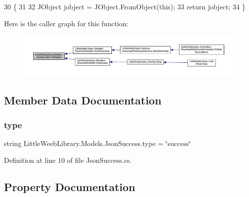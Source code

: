 \begin{DoxyCode}
30         \{
31 
32             JObject jobject = JObject.FromObject(\textcolor{keyword}{this});
33             \textcolor{keywordflow}{return} jobject;
34         \}
\end{DoxyCode}
Here is the caller graph for this function\+:\nopagebreak
\begin{figure}[H]
\begin{center}
\leavevmode
\includegraphics[width=350pt]{class_little_weeb_library_1_1_models_1_1_json_success_aa0e750a34606497266e5a4aedc03cdeb_icgraph}
\end{center}
\end{figure}


\subsection{Member Data Documentation}
\mbox{\label{class_little_weeb_library_1_1_models_1_1_json_success_a6c518d7f5a6e5b08760bda2ea952a0ad}} 
\subsubsection{\texorpdfstring{type}{type}}
{\footnotesize\ttfamily string Little\+Weeb\+Library.\+Models.\+Json\+Success.\+type = \char`\"{}success\char`\"{}}



Definition at line 10 of file Json\+Success.\+cs.



\subsection{Property Documentation}
\mbox{\label{class_little_weeb_library_1_1_models_1_1_json_success_a6ccf690286fe8d8e0e4040d2e7f0e708}} 

